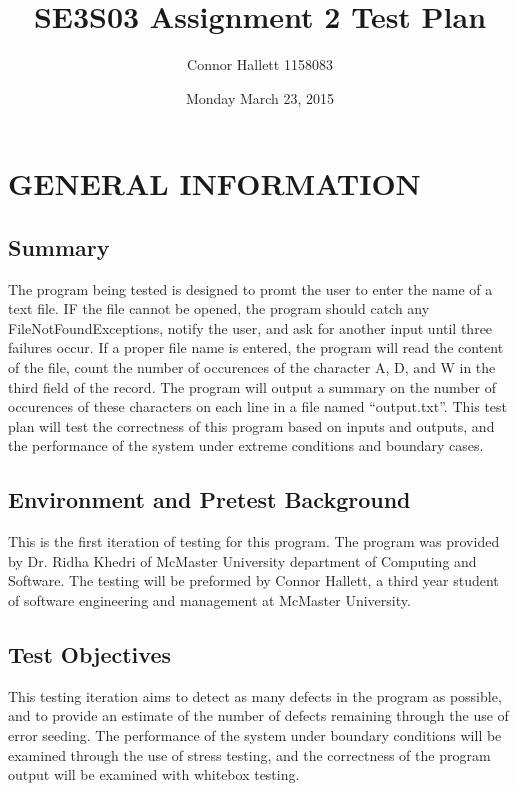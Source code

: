 \documentclass[]{article}
\title{SE3S03 Assignment 2 Test Plan}
\author{Connor Hallett 1158083}
\date{Monday March 23, 2015}
\begin{document}
\maketitle	

\section{GENERAL INFORMATION}
\label{sec:introduction}

\subsection{Summary}
\label{sub:purpose}
The program being tested is designed to promt the user to enter the name of a
text file.  IF the file cannot be opened, the program should catch any
FileNotFoundExceptions, notify the user, and ask for another input until three
failures occur.  If a proper file name is entered, the program will read the
content of the file, count the number of occurences of the character A, D, and W
in the third field of the record.  The program will output a summary on the
number of occurences of these characters on each line in a file named
``output.txt''.  This test plan will test the correctness of this program based
on inputs and outputs, and the performance of the system under extreme
conditions and boundary cases.

\subsection{Environment and Pretest Background}
\label{sub:scope}
This is the first iteration of testing for this program.  The program was
provided by Dr. Ridha Khedri of McMaster University department of Computing and
Software.  The testing will be preformed by Connor Hallett, a third year student
of software engineering and management at McMaster University.

\subsection{Test Objectives}
\label{sub:definitions_acronyms_and_abbreviations}
This testing iteration aims to detect as many defects in the program as
possible, and to provide an estimate of the number of defects remaining through
the use of error seeding. The performance of the system under boundary
conditions will be examined through the use of stress testing, and the
correctness of the program output will be examined with whitebox testing.
\end{document}
